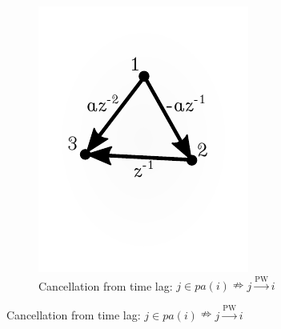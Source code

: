 \documentclass{statsoc}
\def\pwgc{\overset{\text{PW}}{\rightarrow}}  %
\newcommand{\pa}[1]{pa(#1)}  %
\begin{document}
\begin{figure}
\begin{subfigure}[b]{0.35\textwidth}
    \includegraphics[width=\linewidth]{example2.pdf}
    \caption{Cancellation from time lag: $j \in \pa{i} \nRightarrow j \pwgc i$}
    \label{fig:lag_cancellation}
  \end{subfigure}
\end{figure}
\end{document}
